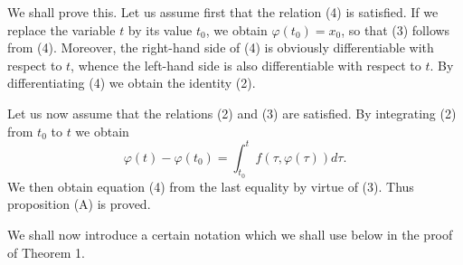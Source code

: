 \documentclass[10pt,a5paper]{book}
\theoremstyle{plain}
\theoremstyle{definition}
\theoremstyle{remark}
\begin{document}
We shall prove this. Let us assume first that the relation (4) is satisfied. If we replace the variable $t$ by its value $t_{0}$, we obtain $\varphi\left(t_{0}\right)=x_{0}$, so that (3) follows from (4). Moreover, the right-hand side of (4) is obviously differentiable with respect to $t$, whence the left-hand side is also differentiable with respect to $t$. By differentiating (4) we obtain the identity (2).

Let us now assume that the relations (2) and (3) are satisfied. By integrating (2) from $t_{0}$ to $t$ we obtain
\[
\varphi(t)-\varphi\left(t_{0}\right)=\int_{t_{0}}^{t} f(\tau, \varphi(\tau)) d \tau .
\]
We then obtain equation (4) from the last equality by virtue of (3). Thus proposition (A) is proved.

We shall now introduce a certain notation which we shall use below in the proof of Theorem 1.
\end{document}
